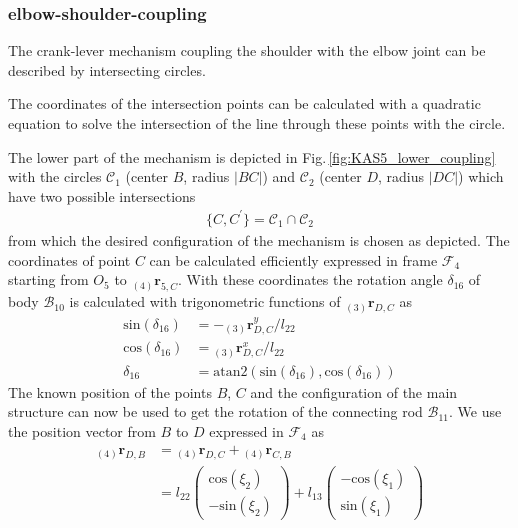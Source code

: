 \documentclass[letterpaper, 10 pt, conference]{ieeeconf}  %
\newcommand{\body}[1]{\mathcal{B}_{#1}}
\newcommand{\ks}[1]{\mathcal{F}_{#1}}
\newcommand{\cc}[1]{\mathcal{C}_{#1}}
\newcommand{\ortvek}[3]{{ }_{(#1)}{\boldsymbol{r}}^{#2}_{#3}}
\begin{document}
\subsubsection{elbow-shoulder-coupling}

The crank-lever mechanism coupling the shoulder with the elbow joint can be described by intersecting circles.

The coordinates of the intersection points can be calculated with a quadratic equation to solve the intersection of the line through these points with the circle.

The lower part of the mechanism is depicted in Fig.\,\ref{fig:KAS5_lower_coupling} with the circles $\cc{1}$ (center $B$, radius $|BC|$) and $\cc{2}$ (center $D$, radius $|DC|$) which have two possible intersections
%
\begin{align}
\{C, C^\prime\} = \cc{1} \cap \cc{2}
\end{align}
%
from which the desired configuration of the mechanism is chosen as depicted.
The coordinates of point $C$ can be calculated efficiently expressed in frame $\ks{4}$ starting from $O_5$ to $\ortvek{4}{}{5,C}$.
%
With these coordinates the rotation angle $\delta_{16}$ of body $\body{10}$ is calculated with trigonometric functions of $\ortvek{3}{}{D,C}$ as
%
\begin{align}
\mathrm{sin}(\delta_{16}) &= -\ortvek{3}{y}{D,C} / l_{22} \\
\mathrm{cos}(\delta_{16}) &= \ortvek{3}{x}{D,C} / l_{22} \\
\delta_{16} &= \mathrm{atan2}(\mathrm{sin}(\delta_{16}), \mathrm{cos}(\delta_{16}))
\label{equ:delta16_explicit}
\end{align}
%
The known position of the points $B$, $C$ and the configuration of the main structure can now be used to get the rotation of the connecting rod $\body{11}$.
We use the position vector from $B$ to $D$ expressed in $\ks{4}$ as
%
\begin{align}
\ortvek{4}{}{D,B} &= \ortvek{4}{}{D,C} + \ortvek{4}{}{C,B} \\
 &= l_{22}\begin{pmatrix}\mathrm{cos}(\xi_2)\\ -\mathrm{sin}(\xi_2) \end{pmatrix} + l_{13}\begin{pmatrix}-\mathrm{cos}(\xi_1)\\ \mathrm{sin}(\xi_1) \end{pmatrix}
\label{equ:delta3_r4DB}
\end{align}
\end{document}

